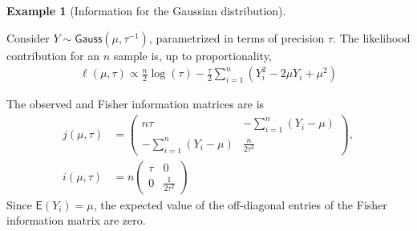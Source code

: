 \documentclass[
  11pt,
  letterpaper,
]{scrbook}
\theoremstyle{definition}
\theoremstyle{plain}
\theoremstyle{plain}
\theoremstyle{definition}
\newtheorem{example}{Example}[chapter]
\theoremstyle{definition}
\theoremstyle{remark}
\begin{document}
\begin{example}[Information for the Gaussian
distribution]\protect\hypertarget{exm-gauss}{}\label{exm-gauss}

Consider \(Y \sim \mathsf{Gauss}(\mu, \tau^{-1})\), parametrized in
terms of precision \(\tau\). The likelihood contribution for an \(n\)
sample is, up to proportionality, \begin{align*}
\ell(\mu, \tau) \propto \frac{n}{2}\log(\tau) - \frac{\tau}{2}\sum_{i=1}^n(Y_i^2-2\mu Y_i+\mu^2)
\end{align*}

The observed and Fisher information matrices are is \begin{align*}
j(\mu, \tau) &= \begin{pmatrix}
n\tau & -\sum_{i=1}^n (Y_i-\mu)\\
-\sum_{i=1}^n (Y_i-\mu) & \frac{n}{2\tau^2}
\end{pmatrix}, \\
i(\mu, \tau) &= n\begin{pmatrix}
\tau & 0\\
0 & \frac{1}{2\tau^2}
\end{pmatrix}
\end{align*} Since \(\mathsf{E}(Y_i) = \mu\), the expected value of the
off-diagonal entries of the Fisher information matrix are zero.

\end{example}
\end{document}
